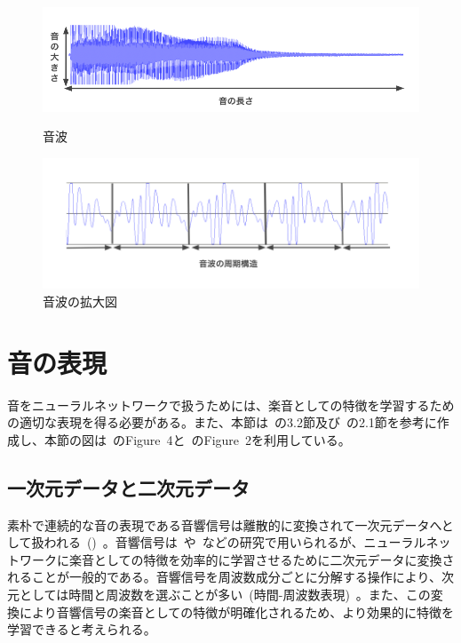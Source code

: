 \begin{figure}[b]
\centering
\begin{minipage}{0.48\columnwidth}
\centering
\includegraphics[width=\columnwidth]{figure/gakuon1.png}
\caption{音波}
\label{fig:gakuon1}
\end{minipage}
\begin{minipage}{0.48\columnwidth}
\centering
\includegraphics[width=\columnwidth]{figure/gakuon2.png}
\caption{音波の拡大図}
\label{fig:gakuon2}
\end{minipage}
\end{figure}

\clearpage

\section{音の表現}

音をニューラルネットワークで扱うためには、楽音としての特徴を学習するための適切な表現を得る必要がある。また、本節は~\cite{musictutorial}の3.2節及び~\cite{timbretron}の2.1節を参考に作成し、本節の図は~\cite{musictutorial}のFigure~4と~\cite{timbretron}のFigure~2を利用している。

\subsection{一次元データと二次元データ}

素朴で連続的な音の表現である音響信号は離散的に変換されて一次元データへとして扱われる~()~。音響信号は~\cite{Jukebox}や~\cite{WaveNet}などの研究で用いられるが、ニューラルネットワークに楽音としての特徴を効率的に学習させるために二次元データに変換されることが一般的である。音響信号を周波数成分ごとに分解する操作により、次元としては時間と周波数を選ぶことが多い~(時間-周波数表現)~。また、この変換により音響信号の楽音としての特徴が明確化されるため、より効果的に特徴を学習できると考えられる。

